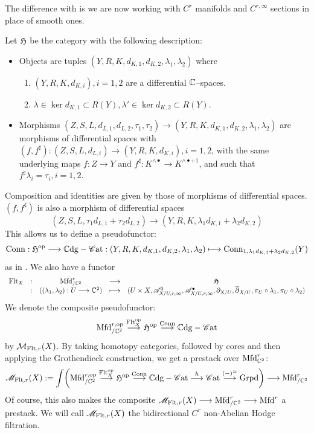 \documentclass[11pt]{amsart}
\begin{document}
\begin{rmk}
The difference with \cite[\S 2]{AR26a} is we are now working with $C^r$ manifolds and
$C^{r, \infty}$ sections in place of smooth ones.
\end{rmk}

\begin{cns}\label{cns:M-Flt-r}
Let $\mathfrak{H}$ be the category with the following description:
\begin{itemize}
\item Objects are tuples $(Y, R, K, d_{K, 1}, d_{K, 2}, \lambda_1, \lambda_2)$ where
    \begin{enumerate}
    \item $(Y, R, K, d_{K, i}), i = 1, 2$ are a differential $\mathbb{C}$--spaces.
    \item $\lambda \in \ker{d_{K, 1}} \subset R(Y), \lambda' \in \ker{d_{K, 2}} \subset R(Y)$.
    \end{enumerate}
\item Morphisms $(Z, S, L, d_{L, 1}, d_{L, 2}, \tau_1, \tau_2) \to
(Y, R, K, d_{K, 1}, d_{K, 2}, \lambda_1, \lambda_2)$ are morphisms of differential spaces
with $(f, f^\sharp) : (Z, S, L, d_{L, i}) \to (Y, R, K, d_{K, i}), i = 1, 2$, with the 
same underlying maps $f : Z \to Y$ and $f^\sharp : K^{\wedge \bullet} \to K^{\wedge \bullet + 1}$,
and such that $f^\sharp \lambda_i = \tau_i, i = 1, 2$.
\end{itemize}
Composition and identities are given by those of morphisms of differential spaces.
$(f, f^\sharp)$ is also a morphism of differential spaces
\[
(Z, S, L, \tau_1d_{L, 1} + \tau_2d_{L, 2}) \to (Y, R, K, \lambda_1d_{K, 1} + \lambda_2d_{K, 2})
\]
This allows us to define a pseudofunctor:
\[
\Conn : \fH^\op \to \bC\dg-\Cat : (Y, R, K, d_{K, 1}, d_{K, 2}, \lambda_1, \lambda_2)
\mapsto \Conn_{1, \lambda_1d_{K, 1} + \lambda_2d_{K, 2}}(Y)
\]
as in \cite[Theorem 3.3.4]{AR26a}.
We also have a functor
\[\begin{array}{ccccc}
\Flt_X &:& \Mfd^r_{/\bC^2} &\to& \fH \\
       &:& ((\lambda_1, \lambda_2) : U \to \bC^2) &\mapsto&
(U \times X, \sA^0_{X/U, r, \infty}, \sA^\bullet_{X/U, r, \infty}, \prt_{X/U}, \oprt_{X/U},
\pi_U \circ \lambda_1, \pi_U \circ \lambda_2)
\end{array}\]
We denote the composite pseudofunctor:
\[
\Mfd^{r, \op}_{/\bC^2} \to[\Flt^\op_X] \fH^\op \to[\Conn] \bC\dg-\Cat
\]
by $\mathcal{M}_{\mathrm{Flt}, r}(X)$.
By taking homotopy categories, followed by cores and then applying the Grothendieck construction, we
get a prestack over $\mathrm{Mfd}^r_{\mathbb{C}^2}$:
\[
\sM_{\Flt, r}(X) := \int \br{\Mfd^{r, \op}_{/\bC^2} \to[\Flt^\op_X] \fH^\op \to[\Conn] \bC\dg-\Cat
\to[h] \Cat \to[(-)^\simeq] \Grpd} \to \Mfd^r_{/\bC^2}
\]
Of course, this also makes the composite $\sM_{\Flt, r}(X) \to \Mfd^r_{/\bC^2} \to \Mfd^r$
a prestack. We will call $\mathscr{M}_{\mathrm{Flt}, r}(X)$ the bidirectional $C^r$ non-Abelian Hodge filtration.
\end{cns}
\end{document}
